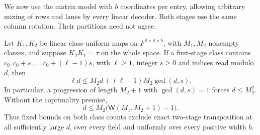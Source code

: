 We now use the matrix model with $b$ coordinates per entry, allowing
arbitrary mixing of rows and lanes by every linear decoder.  Both stages
use the same column rotation.  Their partitions need not agree.

\begin{theorem}\label{thm:two-linear-stages}
Let $K_1,K_2$ be linear class-uniform maps on $F^{d\times d\times b}$,
with $M_1,M_2$ nonempty classes, and suppose $K_2K_1=\tau$ on the
whole space.  If a first-stage class contains
$c_0,c_0+s,\ldots,c_0+(\ell-1)s$, with $\ell\ge1$, integer $s\ge0$
and indices read modulo $d$, then
\begin{equation}\label{eq:two-stage-ap}
 \ell d\le M_2d+(\ell-1)M_2\gcd(d,s).
\end{equation}
In particular, a progression of length $M_2+1$ with $\gcd(d,s)=1$
forces $d\le M_2^2$. Without the coprimality premise,
\begin{equation}\label{eq:two-stage-cutoff}
 d\le M_2\bigl(\mathsf W(M_1,M_2+1)-1\bigr).
\end{equation}
Thus fixed bounds on both class counts exclude exact two-stage
transposition at all sufficiently large $d$, over every field and
uniformly over every positive width $b$.
\end{theorem}
